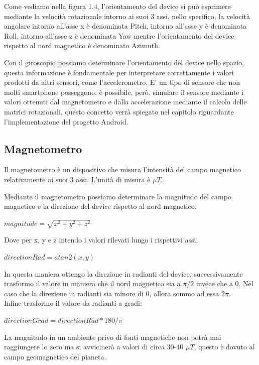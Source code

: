 \documentclass[12pt,a4paper,openright,twoside]{report}
\begin{document}
Come vediamo nella figura 1.4, l'orientamento del device si può esprimere mediante la velocità rotazionale intorno ai suoi 3 assi, nello specifico, la velocità angolare intorno all'asse x è denominata Pitch, intorno all'asse y è denominata Roll, intorno all'asse z è denominata Yaw mentre l'orientamento del device rispetto al nord magnetico è denominato Azimuth.


Con il giroscopio possiamo determinare l'orientamento del device nello spazio, questa informazione è fondamentale per interpretare correttamente i valori prodotti da altri sensori, come l'accelerometro.
E' un tipo di sensore che non molti smartphone posseggono, è possibile, però, simulare il sensore mediante i valori ottenuti dal magnetometro e dalla accelerazione mediante il calcolo delle matrici rotazionali, questo concetto verrà spiegato nel capitolo riguardante l'implementazione del progetto Android.
\subsection{Magnetometro}
Il magnetometro è un dispositivo che misura l'intensità del campo magnetico relativamente ai suoi 3 assi. L'unità di misura è $\mu T$. 


Mediante il magnetometro possiamo determinare la magnitudo del campo magnetico e la direzione del device rispetto al nord magnetico.

\begin{center}
$ magnitude = \sqrt{ x^2 + y^2 + z^2}$
\end{center}
Dove per x, y e z intendo i valori rilevati lungo i rispettivi assi.


\begin{center}
$directionRad = atan2(x,y)$
\end{center}


In questa maniera ottengo la direzione in radianti del device, successivamente trasformo il valore in maniera che il nord magnetico sia a $ \pi / 2$ invece che a 0. Nel caso che la direzione in radianti sia minore di 0, allora sommo ad essa  $2\pi $. \\
Infine trasformo il valore da radianti a gradi:

\begin{center}
$directionGrad = directionRad * 180/ \pi$
\end{center}

La magnitudo in un ambiente privo di fonti magnetiche non potrà mai raggiungere lo zero ma si avvicinerà a valori di circa 30-40 $\mu T$, questo è dovuto al campo geomagnetico del pianeta.
\end{document}
